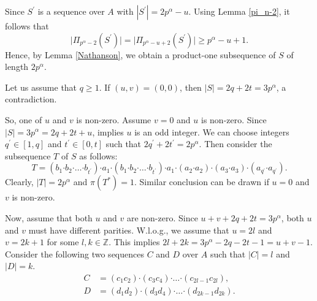 \documentclass[a4paper,11pt]{article}
\numberwithin{equation}{section}
\newcommand{\bdot}{\boldsymbol{\cdot}}
\newcommand{\no}{\noindent}
\begin{document}
\no Since $S^{\prime}$ is a sequence over $A$ with $|S^{\prime}|=2p^{\alpha}-u.$ Using Lemma \ref{pi_n-2}, it follows that
$$\big|\Pi_{p^{\alpha}-2}(S^{\prime})\big| = \big|\Pi_{p^{\alpha}-u+2}(S^{\prime})\big| \ge p^{\alpha}-u+1.$$ Hence, by Lemma \ref{Nathanson}, we obtain a product-one subsequence of $S$ of length $2p^{\alpha}$.

\no {\bf Case 2:} Let us assume that $q \geq 1.$ If $(u,v)=(0,0)$, then $|S|=2q+2t=3p^{\alpha}$, a contradiction. 

\no So, one of $u$ and $v$ is non-zero. Assume $v=0$ and $u$ is non-zero. Since $|S|=3p^{\alpha}=2q+2t+u$, implies $u$ is an odd integer. We can choose integers $q^{\prime} \in [1,q]$ and $t^{\prime} \in [0,t]$ such that $2q^{\prime}+2t^{\prime}=2p^{\alpha}$. Then consider the subsequence $T$ of $S$ as follows:
$$T=(b_1 \bdot b_2 \bdot \dotsc \bdot b_{t^{\prime}})\bdot a_1 \bdot (b_1 \bdot b_2 \bdot \dotsc \bdot b_{t^{\prime}})\bdot a_1 \bdot (a_2\bdot a_2) \bdot (a_3\bdot a_3)\bdot (a_{q^{\prime}}\bdot a_{q^{\prime}}).$$ Clearly, $|T|=2p^{\alpha}$ and $ \pi(T^{\ast}) =1. $ Similar conclusion can be drawn if $u=0$ and $v$ is non-zero.

\no Now, assume that both $u$ and $v$ are non-zero. Since $u+v+2q+2t=3p^{\alpha}$, both $u$ and $v$ must have different parities. W.l.o.g., we assume that $u=2l$ and $v=2k+1$ for some $l,k \in \mathbb{Z}$.
This implies $2l+2k=3p^{\alpha}-2q-2t-1=u+v-1.$ Consider the following two sequences $C$ and $D$ over $A$ such that  $|C|=l$ and $|D|=k$.
 \begin{align*}
     C&=(c_1  c_2) \bdot (c_3  c_4)\bdot \dotsc \bdot (c_{2l-1}  c_{2l}),\\
     D&=(d_1  d_2) \bdot (d_3  d_4)\bdot \dotsc \bdot (d_{2k-1}  d_{2k}).
 \end{align*}
 
\end{document}
